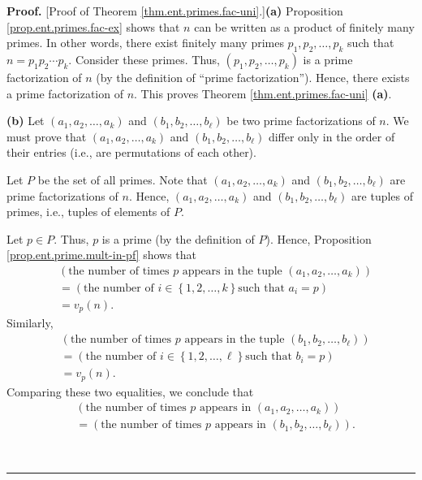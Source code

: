 \documentclass[numbers=enddot,12pt,final,onecolumn,notitlepage]{scrartcl}%
\numberwithin{exer}{subsection}
\theoremstyle{definition}
\newenvironment{proof}[1][Proof]{\noindent\textbf{#1.} }{\ \rule{0.5em}{0.5em}}
\begin{document}
\begin{proof}
[Proof of Theorem \ref{thm.ent.primes.fac-uni}.]\textbf{(a)} Proposition
\ref{prop.ent.primes.fac-ex} shows that $n$ can be written as a product of
finitely many primes. In other words, there exist finitely many primes
$p_{1},p_{2},\ldots,p_{k}$ such that $n=p_{1}p_{2}\cdots p_{k}$. Consider
these primes. Thus, $\left(  p_{1},p_{2},\ldots,p_{k}\right)  $ is a prime
factorization of $n$ (by the definition of \textquotedblleft prime
factorization\textquotedblright). Hence, there exists a prime factorization of
$n$. This proves Theorem \ref{thm.ent.primes.fac-uni} \textbf{(a)}.

\textbf{(b)} Let $\left(  a_{1},a_{2},\ldots,a_{k}\right)  $ and $\left(
b_{1},b_{2},\ldots,b_{\ell}\right)  $ be two prime factorizations of $n$. We
must prove that $\left(  a_{1},a_{2},\ldots,a_{k}\right)  $ and $\left(
b_{1},b_{2},\ldots,b_{\ell}\right)  $ differ only in the order of their
entries (i.e., are permutations of each other).

Let $P$ be the set of all primes. Note that $\left(  a_{1},a_{2},\ldots
,a_{k}\right)  $ and $\left(  b_{1},b_{2},\ldots,b_{\ell}\right)  $ are prime
factorizations of $n$. Hence, $\left(  a_{1},a_{2},\ldots,a_{k}\right)  $ and
$\left(  b_{1},b_{2},\ldots,b_{\ell}\right)  $ are tuples of primes, i.e.,
tuples of elements of $P$.

Let $p\in P$. Thus, $p$ is a prime (by the definition of $P$). Hence,
Proposition \ref{prop.ent.prime.mult-in-pf} shows that%
\begin{align*}
&  \left(  \text{the number of times }p\text{ appears in the tuple }\left(
a_{1},a_{2},\ldots,a_{k}\right)  \right) \\
&  =\left(  \text{the number of }i\in\left\{  1,2,\ldots,k\right\}  \text{
such that }a_{i}=p\right) \\
&  =v_{p}\left(  n\right)  .
\end{align*}
Similarly,%
\begin{align*}
&  \left(  \text{the number of times }p\text{ appears in the tuple }\left(
b_{1},b_{2},\ldots,b_{\ell}\right)  \right) \\
&  =\left(  \text{the number of }i\in\left\{  1,2,\ldots,\ell\right\}  \text{
such that }b_{i}=p\right) \\
&  =v_{p}\left(  n\right)  .
\end{align*}
Comparing these two equalities, we conclude that
\begin{align}
&  \left(  \text{the number of times }p\text{ appears in }\left(  a_{1}%
,a_{2},\ldots,a_{k}\right)  \right) \nonumber\\
&  =\left(  \text{the number of times }p\text{ appears in }\left(  b_{1}%
,b_{2},\ldots,b_{\ell}\right)  \right)  .
\label{pf.thm.ent.primes.fac-uni.b.1}%
\end{align}



\end{proof}
\end{document}
